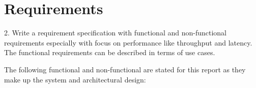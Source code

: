 \section{Requirements}\label{sec:req}

\begin{framed}
2. Write a requirement specification with functional and non-functional requirements especially with focus on performance like throughput and latency. The functional requirements can be described in terms of use cases.
\end{framed}

The following functional and non-functional are stated for this report as they make up the system and architectural design:
